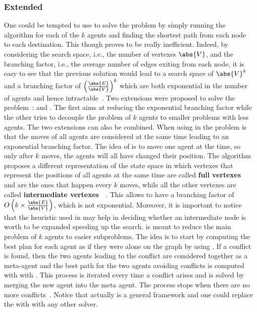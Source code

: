 \subsubsection{Extended \astar}
One could be tempted to use \astar to solve the  problem by simply
running the algorithm for each of the $k$ agents and finding the shortest path
from each node to each destination. This though proves to be really
inefficient. Indeed, by considering the search space, i.e., the number of
vertexes $\abs{V}$, and the branching factor, i.e., the average number of edges
exiting from each node, it is easy to see that the previous solution would lead
to a search space of $\abs{V}^k$ and a branching factor of
$\left(\frac{\abs{E}}{\abs{V}}\right)^k$ which are both exponential in the
number of agents and hence intractable~\cite{MAPF_overview}. \newline
Two extensions were proposed to solve the  problem~\cite{ODandID}: 
 and . The first aims at reducing the exponential branching
factor while the other tries to decouple the problem of $k$ agents to smaller
problems with less agents. The two extensions can also be combined. \newline
When using \astar in  the problem is that the moves of all agents
are considered at the same time leading to an exponential branching factor. The 
idea of  is to move one agent at the time, so only after $k$ moves, 
the agents will all have changed their position. The algorithm proposes a
different representation of the state space in which vertexes that represent
the positions of all agents at the same time are called \textbf{full vertexes}
and are the ones that happen every $k$ moves, while all the other vertexes are 
called \textbf{intermediate vertexes}~\cite{ODandID}~\cite{MAPF_overview}. This
allows to have a branching factor of 
$O\left(k\times\frac{\abs{E}}{\abs{V}}\right)$, which is not exponential.
Moreover, it is important to notice that the heuristic used in \astar may help
in deciding whether an intermediate node is worth to be expanded speeding up
the search. \newline
{} is meant to reduce the main problem of $k$ agents to easier
subproblems. The idea is to start by computing the best plan for each agent as
if they were alone on the graph by using \astar. If a conflict is found, then
the two agents leading to the conflict are considered together as a meta-agent
and the best path for the two agents avoiding conflicts is computed with
\astar with . This process is iterated every time a conflict arises
and is solved by merging the new agent into the meta agent. The process stops
when there are no more conflicts~\cite{ODandID}. \newline
Notice that actually  is a general framework and one could replace the
\astar with  with any other  solver. 
%
